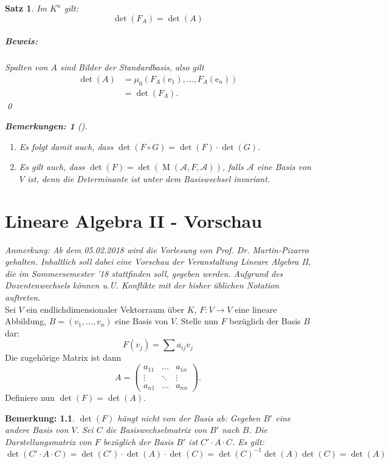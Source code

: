 \documentclass{report}
\newcommand{\ee}{\mathrm{e}}
\newcommand{\basea}{\mathcal{A}}
\DeclareMathOperator{\M}{M}
\theoremstyle{customrem}
\newtheorem*{bemerkung}{Bemerkung\textnormal:}
\newtheorem*{bemerkung2}{Bemerkungen\textnormal:}
\newenvironment{bemerkungen}[1][]{\begin{bemerkung2}[#1]\leavevmode}{\end{bemerkung2}}
\theoremstyle{customdef}
\newtheorem{satz}[definition]{Satz}
\renewenvironment{proof}{\paragraph{Beweis: }}{\qed}
\theoremstyle{customenv}
\begin{document}
	\begin{satz}
		Im \(K^n\) gilt: \[\det(F_A) = \det(A)\]
		\begin{proof}
			Spalten von \(A\) sind Bilder der Standardbasis, also gilt 
			\begin{align*}
				\det(A)	&=\mu_0(F_A(\ee_1),\ldots, F_A(\ee_n))\\
						&= \det{(F_A)}.
			\end{align*}
		\end{proof}
		
		\begin{bemerkungen}
			\begin{enumerate}[label = \roman*)]
				\item Es folgt damit auch, dass \(\det(F\circ G) = \det(F)\cdot\det(G)\).
				\item Es gilt auch, dass \(\det(F) = \det(\M(\basea, F, \basea))\), falls \(\basea\) eine Basis von \(V\) ist, denn die Determinante ist unter dem Basiswechsel invariant.
			\end{enumerate}
		\end{bemerkungen}
	\end{satz}
	
\chapter{Lineare Algebra II - Vorschau}
\textit{Anmerkung: Ab dem 05.02.2018 wird die Vorlesung von Prof. Dr. Martin-Pizarro gehalten. Inhaltlich soll dabei eine Vorschau der Veranstaltung Lineare Algebra II, die im Sommersemester '18 stattfinden soll, gegeben werden. Aufgrund des Dozentenwechsels können u.U. Konflikte mit der bisher üblichen Notation auftreten.}\\

	Sei \(V\) ein endlichdimensionaler Vektorraum über \(K\), \(F:V\to V\) eine lineare Abbildung, \(B = (v_1,\ldots, v_n)\) eine Basis von \(V\). Stelle nun \(F\) bezüglich der Basis \(B\) dar: \[F(v_j)=\sum a_{ij}v_j \tag*{$1\leq j\leq n$}\]
	Die zugehörige Matrix ist dann 
	\[A = 
	\begin{pmatrix}
		a_{11}	& \dots	& a_{1n}\\
		\vdots	&\ddots	& \vdots\\
		a_{n1} 	&\dots	& a_{nn}
	\end{pmatrix}.\]
	Definiere nun \(\det(F) = \det(A)\).
	\begin{bemerkung}
		\(\det(F)\) hängt nicht von der Basis ab: Gegeben \(B'\) eine andere Basis von \(V\). Sei \(C\) die Basiswechselmatrix von \(B'\) nach \(B\). Die Darstellungsmatrix von \(F\) bezüglich der Basis \(B'\) ist \(C'\cdot A \cdot C\). Es gilt: \[\det(C'\cdot A \cdot C) = \det(C') \cdot\det(A)\cdot\det(C) = \det(C)^{-1}\det(A)\det(C) = \det(A)\]
	\end{bemerkung}
	
\end{document}
